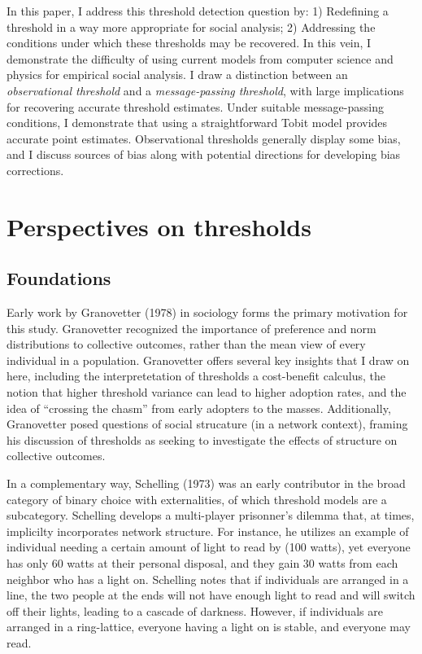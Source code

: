 \documentclass{article}
\begin{document}
In this paper, I address this threshold detection question by: 1) Redefining a threshold in a way more appropriate for social analysis; 2) Addressing the conditions under which these thresholds may be recovered. In this vein, I demonstrate the difficulty of using current models from computer science and physics for empirical social analysis. I draw a distinction between an \emph{observational threshold} and a \emph{message-passing threshold}, with large implications for recovering accurate threshold estimates. Under suitable message-passing conditions, I demonstrate that using a straightforward Tobit model provides accurate point estimates. Observational thresholds generally display some bias, and I discuss sources of bias along with potential directions for developing bias corrections.

\section{Perspectives on thresholds}

\subsection{Foundations}

Early work by Granovetter (1978) in sociology forms the primary motivation for this study. Granovetter recognized the importance of preference and norm distributions to collective outcomes, rather than the mean view of every individual in a population. Granovetter offers several key insights that I draw on here, including the interpretetation of thresholds a cost-benefit calculus, the notion that higher threshold variance can lead to higher adoption rates, and the idea of ``crossing the chasm'' from early adopters to the masses. Additionally, Granovetter posed questions of social strucature (in a network context), framing his discussion of thresholds as seeking to investigate the effects of structure on collective outcomes.

In a complementary way, Schelling (1973) was an early contributor in the broad category of binary choice with externalities, of which threshold models are a subcategory. Schelling develops a multi-player prisonner's dilemma that, at times, implicilty incorporates network structure. For instance, he utilizes an example of individual needing a certain amount of light to read by (100 watts), yet everyone has only 60 watts at their personal disposal, and they gain 30 watts from each neighbor who has a light on. Schelling notes that if individuals are arranged in a line, the two people at the ends will not have enough light to read and will switch off their lights, leading to a cascade of darkness. However, if individuals are arranged in a ring-lattice, everyone having a light on is stable, and everyone may read.
\end{document}
